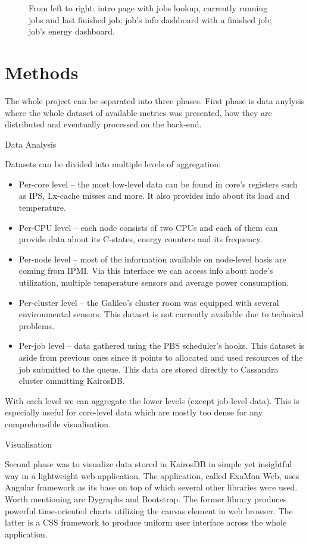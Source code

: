 \documentclass[a4paper, twoside]{article}
\newcommand{\highlight}[1]{\textcolor{prace-orange}{#1}}
\newcommand{\itempar}[1]{\noindent\highlight{\textsf #1}\par\noindent}
\begin{document}
\begin{multicols}{3}
\begin{figure}[b!]
    \caption{From left to right: intro page with jobs lookup, currently running jobs and last finished job; job's info dashboard with a finished job; job's energy dashboard.}
    \label{fig:job}
\end{figure}

\section*{Methods}
The whole project can be separated into three phases. First phase is data anylysis where the whole dataset of available metrics was presented, how they are distributed and eventually processed on the back-end.

\itempar{Data Analysis}
Datasets can be divided into multiple levels of aggregation:
\begin{itemize}
    \item{Per-core level -- the most low-level data can be found in core's registers such as IPS, Lx-cache misses and more. It also provides info about its load and temperature.}
    \item{Per-CPU level -- each node consists of two CPUs and each of them can provide data about its C-states, energy counters and its frequency.}
    \item{Per-node level -- most of the information available on node-level basis are coming from IPMI\cite{ipmi}. Via this interface we can access info about node's utilization, multiple temperature sensors and average power consumption.}
    \item{Per-cluster level -- the Galileo's cluster room was equipped with several environmental sensors. This dataset is not currently available due to technical problems.}
    \item{Per-job level -- data gathered using the PBS scheduler's hooks. This dataset is aside from previous ones since it points to allocated and used resources of the job submitted to the queue. This data are stored directly to Cassandra cluster ommitting KairosDB.}
\end{itemize}

With each level we can aggregate the lower levels (except job-level data). This is especially useful for core-level data which are mostly too dense for any comprehensible visualisation.

\itempar{Visualisation}
Second phase was to visualize data stored in KairosDB in simple yet insightful way in a lightweight web application. The application, called ExaMon Web, uses Angular framework as its base on top of which several other libraries were used. Worth mentioning are Dygraphs and Bootstrap. The former library produces powerful time-oriented charts utilizing the canvas element in web browser. The latter is a CSS framework to produce uniform user interface across the whole application.


\end{multicols}
\end{document}
